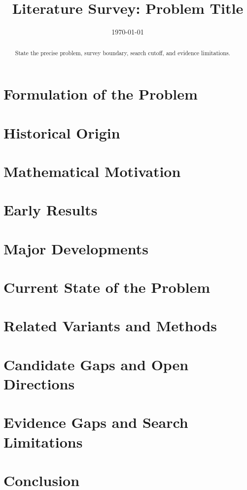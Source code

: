 \documentclass[11pt]{article}
\title{Literature Survey: Problem Title}
\author{}
\date{\today}
\begin{document}
\maketitle
\begin{abstract}
State the precise problem, survey boundary, search cutoff, and evidence limitations.
\end{abstract}
\section{Formulation of the Problem}
\section{Historical Origin}
\section{Mathematical Motivation}
\section{Early Results}
\section{Major Developments}
\section{Current State of the Problem}
\section{Related Variants and Methods}
\section{Candidate Gaps and Open Directions}
\section{Evidence Gaps and Search Limitations}
\section{Conclusion}


\end{document}
